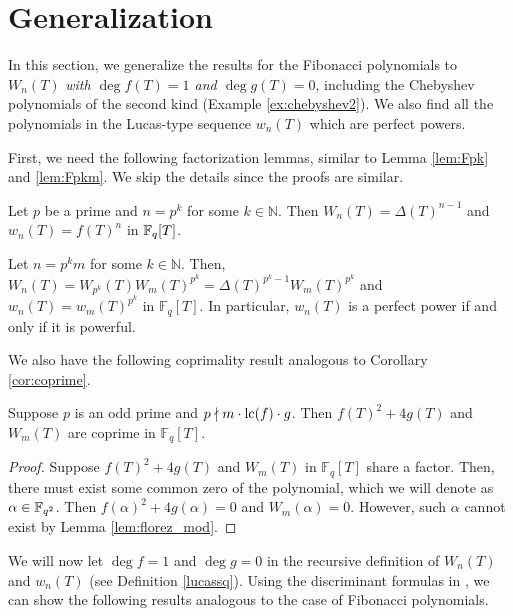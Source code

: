 \section{Generalization}

In this section, we generalize the results for the Fibonacci polynomials to $W_n(T)$ \emph{with $\deg f(T) = 1$ and $\deg g(T) = 0$}, including the Chebyshev polynomials of the second kind (Example \ref{ex:chebyshev2}). We also find all the polynomials in the Lucas-type sequence $w_n(T)$ which are perfect powers. 

First, we need the following factorization lemmas, similar to Lemma \ref{lem:Fpk} and \ref{lem:Fpkm}.
We skip the details since the proofs are similar.

\begin{lemma}
\label{lem:Wwpk}
    Let $p$ be a prime and $n = p^k$ for some $k \in \mathbb{N}$. Then $W_n(T) = \Delta(T)^{n-1}$ and $w_n(T) = f(T)^n$ in $\mathbb{F}_q[T]$.
\end{lemma}


\begin{lemma}
\label{lem:Wwpkm}
    Let $n = p^km$ for some $k \in \mathbb{N}$. Then, $W_n(T) = W_{p^k}(T) W_{m} (T)^{p^k} = \Delta(T)^{p^k - 1} W_{m}(T)^{p^k}$ and $w_n(T) = w_m(T)^{p^k}$ in $\mathbb{F}_q[T]$.
    In particular, $w_n(T)$ is a perfect power if and only if it is powerful.
\end{lemma}


We also have the following coprimality result analogous to Corollary \ref{cor:coprime}.
\begin{proposition}
\label{prop:Wmcoprime}
    Suppose $p$ is an odd prime and $p \nmid m \cdot \mathrm{lc}(f) \cdot g$. Then $f(T)^2 + 4g(T)$ and $W_m(T)$ are coprime in $\mathbb{F}_q[T]$.
\end{proposition}

\begin{proof}
    Suppose $f(T)^2 + 4g(T)$ and $W_m(T)$ in $\mathbb{F}_q[T]$ share a factor. Then, there must exist some common zero of the polynomial, which we will denote as $\alpha \in \mathbb{F}_{q^2}$.
    Then $f(\alpha)^2 + 4g(\alpha) = 0$ and \(W_m(\alpha) = 0\).
    However, such \(\alpha\) cannot exist by Lemma \ref{lem:florez_mod}.
\end{proof}

We will now let $\deg f = 1$ and $\deg g = 0$ in the recursive definition of $W_n(T)$ and $w_n(T)$ (see Definition \ref{lucassq}). Using the discriminant formulas in \cite{florez2019resultant}, we can show the following results analogous to the case of Fibonacci polynomials.

